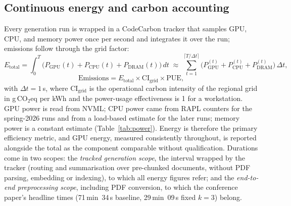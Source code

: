 \documentclass[pdflatex,sn-mathphys-num]{sn-jnl}
\newif\ifprovenance
\newcommand{\verify}[1]{\ifprovenance\textcolor{red}{{\footnotesize [VERIFY: #1]}}\fi}
\newcommand{\gco}{g\,CO$_2$eq}
\theoremstyle{thmstyleone}%
\theoremstyle{thmstylethree}%
\begin{document}
\subsection{Continuous energy and carbon accounting}\label{sec:energy}

Every generation run is wrapped in a CodeCarbon tracker \cite{codecarbon_software,lacoste2019quantifyingcarbonemissionsmachine} that samples GPU, CPU, and memory power once per second and integrates it over the run; emissions follow through the grid factor:
\begin{equation}\label{eq:energy}
E_{\mathrm{total}}=\int_{0}^{T}\bigl(P_{\mathrm{GPU}}(t)+P_{\mathrm{CPU}}(t)+P_{\mathrm{DRAM}}(t)\bigr)\,dt
\;\approx\;\sum_{t=1}^{\lceil T/\Delta t\rceil}\bigl(P^{(t)}_{\mathrm{GPU}}+P^{(t)}_{\mathrm{CPU}}+P^{(t)}_{\mathrm{DRAM}}\bigr)\,\Delta t,
\end{equation}
\begin{equation}\label{eq:emissions}
\mathrm{Emissions}=E_{\mathrm{total}}\times\mathrm{CI}_{\mathrm{grid}}\times\mathrm{PUE},
\end{equation}
with $\Delta t=1$\,s, where $\mathrm{CI}_{\mathrm{grid}}$ is the operational carbon intensity of the regional grid in \gco{} per kWh and the power-usage effectiveness is 1 for a workstation. GPU power is read from NVML; CPU power came from RAPL counters for the spring-2026 runs and from a load-based estimate for the later runs; memory power is a constant estimate (Table~\ref{tab:power}). Energy is therefore the primary efficiency metric, and GPU energy, measured consistently throughout, is reported alongside the total as the component comparable without qualification.\verify{measurement methods: the CodeCarbon start-up messages saved in \texttt{RnD/anthropic\_traditional\_chunking.ipynb} (March: ``Tracking Intel CPU via RAPL interface''; July: ``RAPL -- Permission denied \ldots Falling back on CPU load mode''); the grid factor is \texttt{emissions}/\texttt{energy\_consumed} of each row of \texttt{RnD/emissions\_data/emissions.csv} (204.19 for the four 3.2.3 rows; 211.50--214.03 for the complete 3.3.1 rows)} Durations come in two scopes: the \emph{tracked generation scope}, the interval wrapped by the tracker (routing and summarisation over pre-chunked documents, without PDF parsing, embedding or indexing), to which all energy figures refer; and the \emph{end-to-end preprocessing scope}, including PDF conversion, to which the conference paper's headline times (71\,min~34\,s baseline, 29\,min~09\,s fixed $k=3$) belong.
\end{document}

